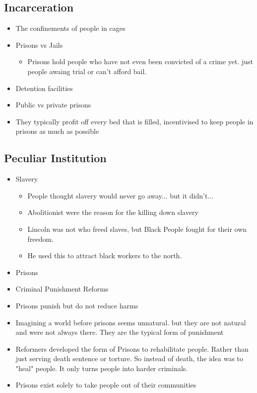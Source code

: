 \documentclass{article}
\begin{document}
\subsection{Incarceration}
\begin{itemize}
  \item The confinements of people in cages
  \item Prisons vs Jails
    \begin{itemize}
      \item Prisons hold people who have
        not even been convicted of a crime yet.
        just people awaing trial or
        can't afford bail.
    \end{itemize}
  \item Detention facilities
  \item Public vs private prisons
  \item They typically profit off every bed that is filled,
    incentivised to keep people in prisons as much as possible
\end{itemize}

\subsection{Peculiar Institution}
\begin{itemize}
  \item Slavery
    \begin{itemize}
      \item People thought slavery would never go away...
        but it didn't...
      \item Abolitionist were the reason for the killing down slavery
      \item Lincoln was not who freed slaves, but Black People fought for their
        own freedom.
      \item He used this to attract black workers to the north.
    \end{itemize}
  \item Prisons
  \item Criminal Punishment Reforms
  \item Prisons punish but do not reduce harms
  \item Imagining a world before prisons seems unnatural. but they are not
    natural and were not always there.
    They are the typical form of punishment
  \item Reformers developed the form of Prisons to rehabilitate people.
    Rather than just serving death sentence or torture. So instead of death,
    the idea was to "heal" people.
    It only turns people into harder criminals.
  \item Prisons exist solely to take people out of their communities
\end{itemize}
\end{document}
